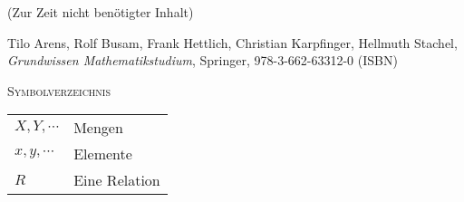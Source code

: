 \documentclass[a4paper]{amsart}
\theoremstyle{definition}
\begin{document}
\begin{backup}
    (Zur Zeit nicht benötigter Inhalt)
\end{backup}

\begin{thebibliography}{9}

      Tilo Arens, Rolf Busam, Frank Hettlich, Christian Karpfinger, Hellmuth Stachel, \emph{Grundwissen Mathematikstudium},
      Springer, 978-3-662-63312-0 (ISBN)
      
\end{thebibliography}

\begin{large}
    \centerline{\textsc{Symbolverzeichnis}}
\end{large}
\bigskip

\renewcommand*{\arraystretch}{1}

\begin{tabular}{ll}
    $X, Y, \cdots$          & Mengen\\
    $x, y, \cdots$             & Elemente\\
    $R$             & Eine Relation
   
\end{tabular}
\end{document}
